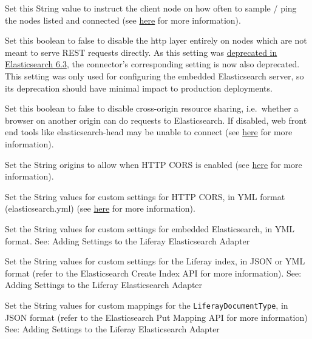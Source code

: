 \begin{description}
\tightlist
\item[\texttt{clientTransportNodesSamplerInterval=}]
Set this String value to instruct the client node on how often to sample
/ ping the nodes listed and connected (see
\href{https://www.elastic.co/guide/en/elasticsearch/client/java-api/6.5/transport-client.html}{here}
for more information).
\item[\texttt{httpEnabled=true}]
Set this boolean to false to disable the http layer entirely on nodes
which are not meant to serve REST requests directly. As this setting was
\href{https://www.elastic.co/guide/en/elasticsearch/reference/current/release-notes-6.3.0.html\#deprecation-6.3.0}{deprecated
in Elasticsearch 6.3}, the connector's corresponding setting is now also
deprecated. This setting was only used for configuring the embedded
Elasticsearch server, so its deprecation should have minimal impact to
production deployments.
\item[\texttt{httpCORSEnabled=true}]
Set this boolean to false to disable cross-origin resource sharing,
i.e.~whether a browser on another origin can do requests to
Elasticsearch. If disabled, web front end tools like elasticsearch-head
may be unable to connect (see
\href{https://www.elastic.co/guide/en/elasticsearch/reference/6.5/modules-http.html\#_settings_2}{here}
for more information).
\item[\texttt{httpCORSAllowOrigin=/https?:\textbackslash{}\textbackslash{}/\textbackslash{}\textbackslash{}/localhost(:{[}0-9{]}+)?/}]
Set the String origins to allow when HTTP CORS is enabled (see
\href{https://www.elastic.co/guide/en/elasticsearch/reference/6.5/modules-http.html\#_settings_2}{here}
for more information).
\item[\texttt{httpCORSConfigurations=}]
Set the String values for custom settings for HTTP CORS, in YML format
(elasticsearch.yml) (see
\href{https://www.elastic.co/guide/en/elasticsearch/reference/6.5/modules-http.html\#_settings_2}{here}
for more information).
\item[\texttt{additionalConfigurations=}]
Set the String values for custom settings for embedded Elasticsearch, in
YML format. See: Adding Settings to the Liferay Elasticsearch Adapter
\item[\texttt{additionalIndexConfigurations=}]
Set the String values for custom settings for the Liferay index, in JSON
or YML format (refer to the Elasticsearch Create Index API for more
information). See: Adding Settings to the Liferay Elasticsearch Adapter
\item[\texttt{additionalTypeMappings=}]
Set the String values for custom mappings for the
\texttt{LiferayDocumentType}, in JSON format (refer to the Elasticsearch
Put Mapping API for more information) See: Adding Settings to the
Liferay Elasticsearch Adapter
\end{description}


